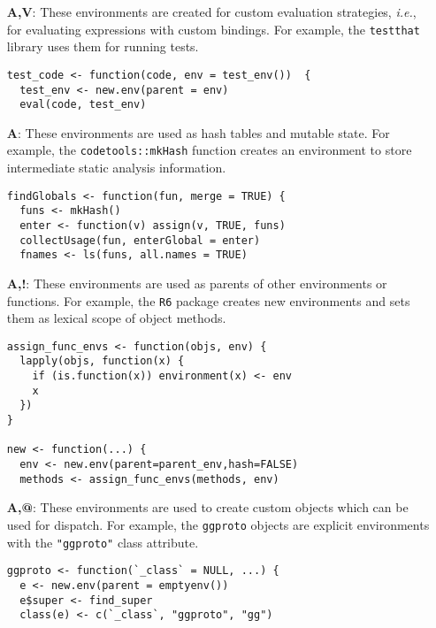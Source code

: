 \documentclass[10pt,sigplan,authorversion=true]{acmart}
\renewcommand{\c}[1]{\lstinline |#1|\xspace}
\newcommand{\ie}{\emph{i.e.},\xspace}
\begin{document}
\begin{itemize}
\item[{\bf A,V}:] These environments are created for custom evaluation
  strategies, \ie for evaluating expressions with custom bindings. For example,
  the \c{testthat} library uses them for running tests.

\begin{lstlisting}
test_code <- function(code, env = test_env())  {
  test_env <- new.env(parent = env)
  eval(code, test_env)
\end{lstlisting}\medskip

  \item[{\bf A}:] These environments are used as hash tables and mutable state.
    For example, the \c{codetools::mkHash} function creates an environment to
    store intermediate static analysis information.

\begin{lstlisting}
findGlobals <- function(fun, merge = TRUE) {
  funs <- mkHash()
  enter <- function(v) assign(v, TRUE, funs)
  collectUsage(fun, enterGlobal = enter)
  fnames <- ls(funs, all.names = TRUE)
\end{lstlisting}\medskip

  \item[{\bf A,!}:] These environments are used as parents of other environments
    or functions. For example, the \c{R6} package creates new environments and
    sets them as lexical scope of object methods.

\begin{lstlisting}
assign_func_envs <- function(objs, env) {
  lapply(objs, function(x) {
    if (is.function(x)) environment(x) <- env
    x
  })
}

new <- function(...) {
  env <- new.env(parent=parent_env,hash=FALSE)
  methods <- assign_func_envs(methods, env)
\end{lstlisting}\medskip
  
  \item[{\bf A,@}:] These environments are used to create custom objects which
    can be used for dispatch. For example, the \c{ggproto} objects are explicit
    environments with the \c{"ggproto"} class attribute.

\begin{lstlisting}
ggproto <- function(`_class` = NULL, ...) {
  e <- new.env(parent = emptyenv())
  e$super <- find_super
  class(e) <- c(`_class`, "ggproto", "gg")
\end{lstlisting}\medskip


\end{itemize}
\end{document}
